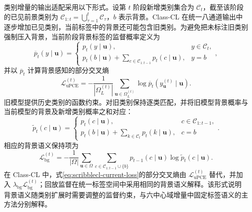 类别增量的输出适配采用以下形式。设第 $t$ 阶段新增类别集合为 $\mathcal{C}_t$，截至该阶段的已见前景类别为 $\mathcal{C}_{1:t}=\bigcup_{\tau=1}^{t}\mathcal{C}_{\tau}$，$b$ 表示背景。Class-CL 在统一八通道输出中逐步增加已见类别，当前标签中的背景还可能包含旧类别。为避免把未标注旧类别强制压入背景，当前阶段背景标签的监督概率定义为\cite{cermelli2020mib}
\begin{equation}
\overline{p}_{t}(y\mid\mathbf{u})
=
\begin{cases}
p_t(y\mid\mathbf{u}), & y\in\mathcal{C}_t,\\[1mm]
p_t(b\mid\mathbf{u})+
\displaystyle\sum_{c\in\mathcal{C}_{1:t-1}}p_t(c\mid\mathbf{u}), & y=b
\end{cases},
\label{eq:scribblecl-background-aware-probability}
\end{equation}
并以 $\overline p_t$ 计算背景感知的部分交叉熵
\begin{equation}
\mathcal{L}_{\mathrm{uPCE}}^{(t)}
=
-\frac{1}{|\Omega_L^{(t)}|}
\sum_{\mathbf{u}\in\Omega_L^{(t)}}
\log \overline p_t\!\left(y_{\mathbf{u}}^{(t)}\mid\mathbf{u}\right).
\label{eq:scribblecl-background-aware-pce}
\end{equation}
旧模型提供历史类别的函数约束。对旧类别保持逐类匹配，并将旧模型背景概率与当前模型的背景及新增类别概率之和对应：
\begin{equation}
\widetilde p_t(c\mid\mathbf{u})
=
\begin{cases}
p_t(c\mid\mathbf{u}), & c\in\mathcal{C}_{1:t-1},\\[1mm]
p_t(b\mid\mathbf{u})+
\displaystyle\sum_{k\in\mathcal{C}_t}p_t(k\mid\mathbf{u}), & c=b
\end{cases}.
\label{eq:scribblecl-background-aware-distillation-probability}
\end{equation}
相应的背景语义保持项为
\begin{equation}
\mathcal{L}_{\mathrm{bg}}^{(t)}
=
-\frac{1}{|\Omega|}
\sum_{\mathbf{u}\in\Omega}
\sum_{c\in\mathcal{C}_{1:t-1}\cup\{b\}}
p_{t-1}(c\mid\mathbf{u})
\log \widetilde p_t(c\mid\mathbf{u}).
\label{eq:scribblecl-background-aware-distillation}
\end{equation}
在 Class-CL 中，式\eqref{eq:scribblecl-current-loss}的部分交叉熵由 $\mathcal{L}_{\mathrm{uPCE}}^{(t)}$ 替代，并加入 $\lambda_{\mathrm{bg}}\mathcal{L}_{\mathrm{bg}}^{(t)}$；回放监督在统一标签空间中采用相同的背景语义解释。该形式说明背景语义随类别扩展时需要调整的监督约束，与六中心域增量中固定标签语义的主方法分别解释。

